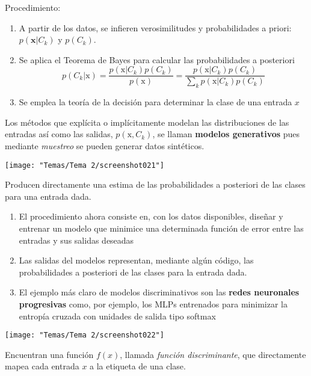 \begin{minipage}{0.5\textwidth}
	Procedimiento:
	\begin{enumerate}[label=\color{lightblue}\arabic*)]
		\item A partir de los datos, se infieren verosimilitudes y probabilidades a priori: $p(\mathbf{x}|C_k)$ y $p(C_k)$.
		\item Se aplica el Teorema de Bayes para calcular las probabilidades a posteriori \[ p(C_k|\mathrm{x})=\dfrac{p(\mathrm{x}|C_k)p(C_k)}{p(\mathrm{x})}=\dfrac{p(\mathrm{x}|C_k)p(C_k)}{\displaystyle\sum_kp(\mathrm{x}|C_k)p(C_k)} \]
		\item Se emplea la teoría de la decisión para determinar la clase de una entrada $x$
	\end{enumerate}
	Los métodos que explícita o implícitamente modelan las distribuciones de las entradas así como las salidas, $p(\mathrm{x},C_k)$, se llaman \textbf{modelos generativos} pues mediante \textit{muestreo} se pueden generar datos sintéticos.
\end{minipage}\qquad\begin{minipage}{0.5\textwidth}
\begin{center}
	\texttt{[image: "Temas/Tema 2/screenshot021"]}
\end{center}
\end{minipage}
Producen directamente una estima de las probabilidades a posteriori de las clases para una entrada dada.
\begin{enumerate}[label=\color{lightblue}\arabic*)]
	\item El procedimiento ahora consiste en, con los datos disponibles, diseñar y entrenar un modelo que minimice una determinada función de error entre las entradas y sus salidas deseadas
	\item Las salidas del modelos representan, mediante algún código, las probabilidades a posteriori de las clases para la entrada dada.
	\item El ejemplo más claro de modelos discriminativos son las \textbf{redes neuronales progresivas} como, por ejemplo, los MLPs entrenados para minimizar la entropía cruzada con unidades de salida tipo softmax
\end{enumerate}
\begin{center}
	\texttt{[image: "Temas/Tema 2/screenshot022"]}
\end{center}
Encuentran una función $f(x)$, llamada \textit{función discriminante}, que directamente mapea cada entrada $x$ a la etiqueta de una clase.

